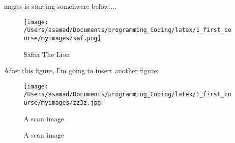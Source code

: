 \documentclass{article}
\begin{document}
	

mages is starting somehwere below....
\begin{figure}[H]
	\centering
	\texttt{[image: /Users/asamad/Documents/programming\_Coding/latex/1\_first\_course/myimages/saf.png]}
	\caption{Safaa The Lion}
	
\end{figure}

After this figure, I'm going to insert another figure:

\begin{figure}[b]
	\centering
	\texttt{[image: /Users/asamad/Documents/programming\_Coding/latex/1\_first\_course/myimages/zz3z.jpg]}
	\caption{A scan image}
\end{figure}


\begin{figure}[b]
	\centering
	\caption{A scan image}
\end{figure}










	
	
	
\end{document}
